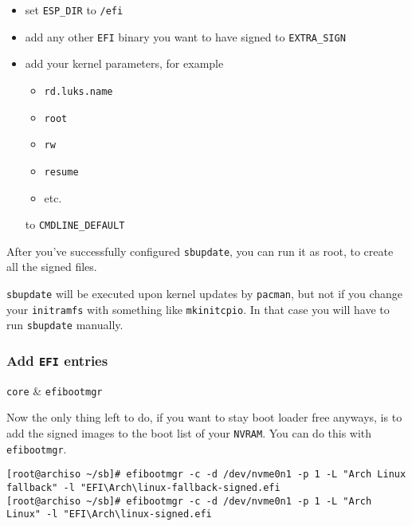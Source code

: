 \documentclass[10pt]{dustdoc}
\begin{document}
\begin{itemize}
    \item set \texttt{ESP_DIR} to \texttt{/efi}

    \item add any other \texttt{EFI} binary you want to have signed to \texttt{EXTRA_SIGN}

    \item add your kernel parameters, for example

        \begin{itemize}
            \item \texttt{rd.luks.name}
            \item \texttt{root}
            \item \texttt{rw}
            \item \texttt{resume}
            \item etc.
        \end{itemize}

        \noindent
        to \texttt{CMDLINE_DEFAULT}
\end{itemize}

After you’ve successfully configured \texttt{sbupdate}, you can run it as root, to create all the signed files.

\begin{NOTE}
    \texttt{sbupdate} will be executed upon kernel updates by \texttt{pacman}, but not if you change your \texttt{initramfs} with something like \texttt{mkinitcpio}.
    In that case you will have to run \texttt{sbupdate} manually.
\end{NOTE}

\subsubsection{Add \texttt{EFI} entries}
\label{sec:add-efi-entries}

\begin{packagetable}
    \texttt{core} & \texttt{efibootmgr} \\
\end{packagetable}

Now the only thing left to do, if you want to stay boot loader free anyways, is to add the signed images to the boot list of your \texttt{NVRAM}.
You can do this with \texttt{efibootmgr}.

\begin{verbatim}
[root@archiso ~/sb]# efibootmgr -c -d /dev/nvme0n1 -p 1 -L "Arch Linux fallback" -l "EFI\Arch\linux-fallback-signed.efi
[root@archiso ~/sb]# efibootmgr -c -d /dev/nvme0n1 -p 1 -L "Arch Linux" -l "EFI\Arch\linux-signed.efi
\end{verbatim}
\end{document}
